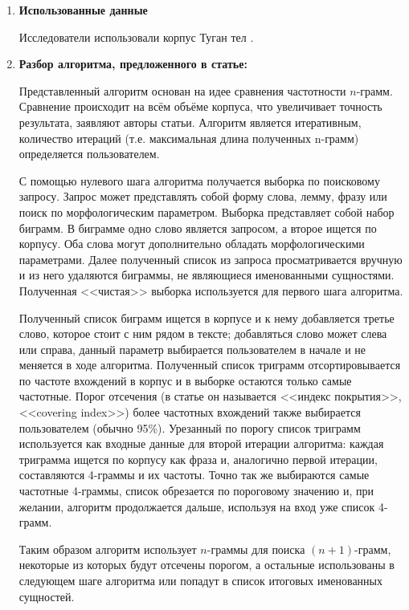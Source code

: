 \begin{enumerate}

\item\textbf{Использованные данные}

Исследователи использовали корпус Туган тел \cite{tugan_tel}.

\item\textbf{Разбор алгоритма, предложенного в статье:}

Представленный алгоритм основан на идее сравнения частотности $n$-грамм. Сравнение происходит на всём 
объёме корпуса, что увеличивает точность результата, заявляют авторы статьи. Алгоритм является итеративным, количество итераций (т.е. максимальная длина полученных n-грамм) определяется пользователем.

С помощью нулевого шага алгоритма получается выборка по поисковому запросу. Запрос может 
представлять собой форму слова, лемму, фразу или поиск по морфологическим параметром. 
Выборка представляет собой набор биграмм. В биграмме одно 
слово является запросом, а второе ищется по корпусу. Оба слова могут дополнительно обладать морфологическими параметрами. Далее полученный список из запроса просматривается вручную и из него удаляются биграммы, не являющиеся именованными сущностями. Полученная <<чистая>> выборка используется для первого шага алгоритма.

Полученный список биграмм ищется в корпусе и к нему добавляется третье слово, которое стоит с ним рядом в тексте; добавляться слово может слева или справа, данный параметр выбирается пользователем в начале и не меняется в ходе алгоритма. Полученный список триграмм отсортировывается по частоте 
вхождений в корпус и в выборке остаются только самые частотные. Порог отсечения (в статье он называется <<индекс 
покрытия>>, <<covering index>>) более частотных вхождений также выбирается пользователем (обычно 95\%). 
Урезанный по порогу список триграмм используется как входные данные для второй итерации 
алгоритма: каждая триграмма ищется по корпусу как фраза и, аналогично первой итерации, 
составляются 4-граммы и их частоты. Точно так же выбираются самые частотные 4-граммы, список обрезается по пороговому значению и, при желании, алгоритм продолжается дальше, используя на вход уже список 4-грамм.

Таким образом алгоритм использует $n$-граммы для поиска $(n+1)$-грамм, некоторые из которых будут отсечены порогом, а остальные использованы в следующем шаге алгоритма или попадут в список итоговых именованных сущностей.


\end{enumerate}
